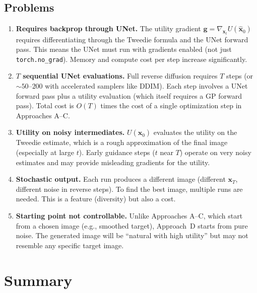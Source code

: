 \documentclass[11pt]{article}
\newcommand{\xb}{\mathbf{x}}
\begin{document}
\subsection{Problems}

\begin{enumerate}
    \item \textbf{Requires backprop through UNet.}
    The utility gradient $\mathbf{g} = \nabla_{\xb_t} U(\hat{\xb}_0)$ requires
    differentiating through the Tweedie formula and the UNet forward pass. This means
    the UNet must run with gradients enabled (not just \texttt{torch.no\_grad}).
    Memory and compute cost per step increase significantly.

    \item \textbf{$T$ sequential UNet evaluations.}
    Full reverse diffusion requires $T$ steps (or $\sim 50$--$200$ with accelerated
    samplers like DDIM). Each step involves a UNet forward pass plus a utility
    evaluation (which itself requires a GP forward pass). Total cost is $O(T)$ times
    the cost of a single optimization step in Approaches A--C.

    \item \textbf{Utility on noisy intermediates.}
    $U(\hat{\xb}_0)$ evaluates the utility on the Tweedie estimate, which is a rough
    approximation of the final image (especially at large $t$). Early guidance steps
    ($t$ near $T$) operate on very noisy estimates and may provide misleading gradients
    for the utility.

    \item \textbf{Stochastic output.}
    Each run produces a different image (different $\xb_T$, different noise in reverse
    steps). To find the best image, multiple runs are needed. This is a feature
    (diversity) but also a cost.

    \item \textbf{Starting point not controllable.}
    Unlike Approaches A--C, which start from a chosen image (e.g., smoothed target),
    Approach~D starts from pure noise. The generated image will be ``natural with high
    utility'' but may not resemble any specific target image.
\end{enumerate}


\section{Summary}
\end{document}

